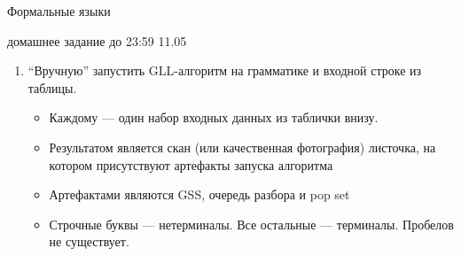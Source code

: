 \documentclass[12pt]{article}
\begin{document}
\begin{center}
  \LARGE Формальные языки 

  \Large домашнее задание до 23:59 11.05
\end{center}
\bigskip

\begin{enumerate}
  \item ``Вручную'' запустить GLL-алгоритм на грамматике и входной строке из таблицы. 
  
  \begin{itemize}
      \item Каждому --- один набор входных данных из таблички внизу.
      \item Результатом является скан (или качественная фотография) листочка, на котором присутствуют артефакты запуска алгоритма
      \item Артефактами являются GSS, очередь разбора и pop set
      \item Строчные буквы --- нетерминалы. Все остальные --- терминалы. Пробелов не существует.
  \end{itemize}


\end{enumerate}
\end{document}
